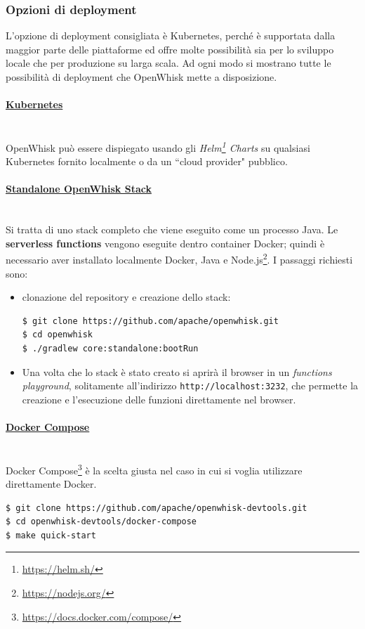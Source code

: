 \documentclass[12pt,a4paper,openany,twoside]{book}
\begin{document}
\subsubsection{Opzioni di deployment}

L'opzione di deployment consigliata è Kubernetes, perché è supportata dalla maggior parte delle piattaforme ed offre molte possibilità sia per lo sviluppo locale che per produzione su larga scala. Ad ogni modo si mostrano tutte le possibilità di deployment che OpenWhisk mette a disposizione.

\paragraph{\underline{Kubernetes}} ~\\
OpenWhisk può essere dispiegato usando gli \textit{Helm\footnote{\url{https://helm.sh/}} Charts} su qualsiasi Kubernetes fornito localmente o da un ``cloud provider" pubblico.

\paragraph{\underline{Standalone OpenWhisk Stack}} ~\\
Si tratta di uno stack completo che viene eseguito come un processo Java. Le \textbf{serverless functions} vengono eseguite dentro container Docker; quindi è necessario aver installato localmente Docker, Java e Node.js\footnote{\url{https://nodejs.org/}}.
I passaggi richiesti sono:
\begin{itemize}
    \item clonazione del repository e creazione dello stack:
    \begin{lstlisting}
$ git clone https://github.com/apache/openwhisk.git
$ cd openwhisk
$ ./gradlew core:standalone:bootRun\end{lstlisting}

    \item Una volta che lo stack è stato creato si aprirà il browser in un \textit{functions playground}, solitamente all'indirizzo \texttt{http://localhost:3232}, che permette la creazione e l'esecuzione delle funzioni direttamente nel browser.
\end{itemize}

\paragraph{\underline{Docker Compose}} ~\\
Docker Compose\footnote{\url{https://docs.docker.com/compose/}} è la scelta giusta nel caso in cui si voglia utilizzare direttamente Docker. 
\begin{lstlisting}
$ git clone https://github.com/apache/openwhisk-devtools.git
$ cd openwhisk-devtools/docker-compose
$ make quick-start\end{lstlisting}
\end{document}
